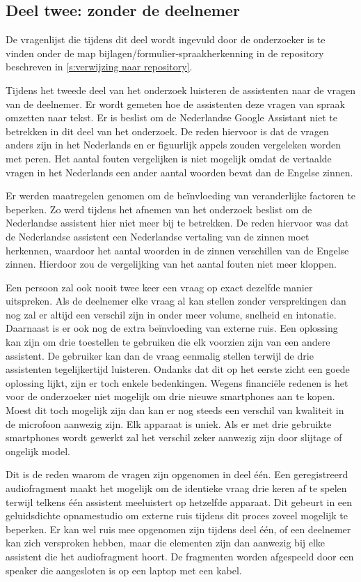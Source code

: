 \subsection{Deel twee: zonder de deelnemer}
De vragenlijst die tijdens dit deel wordt ingevuld door de onderzoeker is te vinden onder de map bijlagen/formulier-spraakherkenning in de repository beschreven in \ref{s:verwijzing naar repository}.

Tijdens het tweede deel van het onderzoek luisteren de assistenten naar de vragen van de deelnemer. Er wordt gemeten hoe de assistenten deze vragen van spraak omzetten naar tekst. 
Er is beslist om de Nederlandse Google Assistant niet te betrekken in dit deel van het onderzoek. De reden hiervoor is dat de vragen anders zijn in het Nederlands en er figuurlijk appels zouden vergeleken worden met peren. Het aantal fouten vergelijken is niet mogelijk omdat de vertaalde vragen in het Nederlands een ander aantal woorden bevat dan de Engelse zinnen.

Er werden maatregelen genomen om de beïnvloeding van veranderlijke factoren te beperken. Zo werd tijdens het afnemen van het onderzoek beslist om de Nederlandse assistent hier niet meer bij te betrekken. De reden hiervoor was dat de Nederlandse assistent een Nederlandse vertaling van de zinnen moet herkennen, waardoor het aantal woorden in de zinnen verschillen van de Engelse zinnen. Hierdoor zou de vergelijking van het aantal fouten niet meer kloppen.

Een persoon zal ook nooit twee keer een vraag op exact dezelfde manier uitspreken. Als de deelnemer elke vraag al kan stellen zonder versprekingen dan nog zal er altijd een verschil zijn in onder meer volume, snelheid en intonatie. Daarnaast is er ook nog de extra beïnvloeding van externe ruis.
Een oplossing kan zijn om drie toestellen te gebruiken die elk voorzien zijn van een andere assistent. De gebruiker kan dan de vraag eenmalig stellen terwijl de drie assistenten tegelijkertijd luisteren. Ondanks dat dit op het eerste zicht een goede oplossing lijkt, zijn er toch enkele bedenkingen. Wegens financiële redenen is het voor de onderzoeker niet mogelijk om drie nieuwe smartphones aan te kopen. Moest dit toch mogelijk zijn dan kan er nog steeds een verschil van kwaliteit in de microfoon aanwezig zijn. Elk apparaat is uniek. Als er met drie gebruikte smartphones wordt gewerkt zal het verschil zeker aanwezig zijn door slijtage of ongelijk model.

Dit is de reden waarom de vragen zijn opgenomen in deel één. Een geregistreerd audiofragment maakt het mogelijk om de identieke vraag drie keren af te spelen terwijl telkens één assistent meeluistert op hetzelfde apparaat. Dit gebeurt in een geluidsdichte opnamestudio om externe ruis tijdens dit proces zoveel mogelijk te beperken. Er kan wel ruis mee opgenomen zijn tijdens deel één, of een deelnemer kan zich versproken hebben, maar die elementen zijn dan aanwezig bij elke assistent die het audiofragment hoort. De fragmenten worden afgespeeld door een speaker die aangesloten is op een laptop met een kabel.

